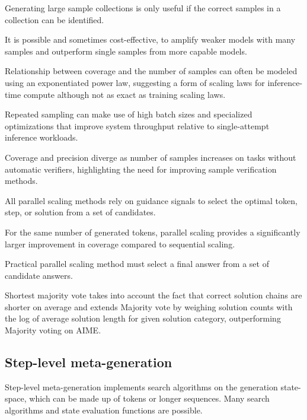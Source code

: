 Generating large sample collections is only useful if the correct samples in a collection can be identified. \cite{brown2024largelanguagemonkeysscaling}

It is possible and sometimes cost-effective, to amplify weaker models with many samples and outperform 
single samples from more capable models. \cite{brown2024largelanguagemonkeysscaling}

Relationship between coverage and the number of samples can often be modeled using an exponentiated power law, suggesting a form of scaling laws for inference-time compute although not as exact as training scaling laws. \cite{brown2024largelanguagemonkeysscaling}

Repeated sampling can make use of high batch sizes and specialized optimizations that improve 
system throughput relative to single-attempt inference workloads. \cite{brown2024largelanguagemonkeysscaling}

Coverage and precision diverge as number of samples increases on tasks without automatic verifiers, 
highlighting the need for improving sample verification methods. \cite{brown2024largelanguagemonkeysscaling}


All parallel scaling methods rely on guidance signals to select the optimal token, step, or solution from a set of candidates. \cite{zeng2025revisitingtesttimescalingo1like}

For the same number of generated tokens, parallel scaling provides a significantly larger improvement in coverage compared to sequential scaling. \cite{zeng2025revisitingtesttimescalingo1like}

Practical parallel scaling method must select a final answer from a set of candidate answers. \cite{zeng2025revisitingtesttimescalingo1like}

Shortest majority vote takes into account the fact that correct solution chains are shorter on average and extends Majority vote by weighing solution counts with the log of average solution length for given solution category, outperforming Majority voting on AIME. \cite{zeng2025revisitingtesttimescalingo1like}

\subsection{Step-level meta-generation}
Step-level meta-generation implements search algorithms on the generation state-space, which can be made up of tokens or longer sequences. Many search algorithms and state evaluation functions are possible. \cite{welleck2024decodingmetagenerationinferencetimealgorithms}


